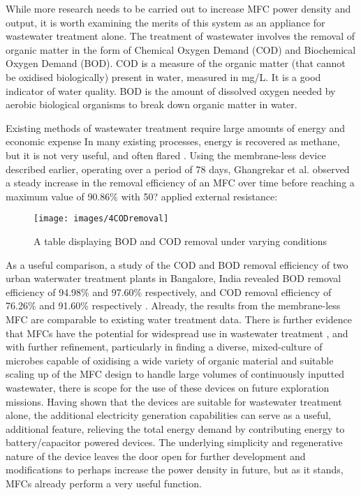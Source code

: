 \documentclass[12pt]{article}
\begin{document}
While more research needs to be carried out to increase MFC power density and output, it is worth examining the merits of this system as an appliance for wastewater treatment alone. The treatment of wastewater involves the removal of organic matter in the form of Chemical Oxygen Demand (COD) and Biochemical Oxygen Demand (BOD). COD is a measure of the organic matter (that cannot be oxidised biologically) present in water, measured in mg/L. It is a good indicator of water quality. BOD is the amount of dissolved oxygen needed by aerobic biological organisms to break down organic matter in water. \cite{surez2005determination} 

Existing methods of wastewater treatment require large amounts of energy and economic expense In many existing processes, energy is recovered as methane, but it is not very useful, and often flared \cite{ghangrekar2006wastewater,chang2005improvement}. Using the membrane-less device described earlier, operating over a period of 78 days, Ghangrekar et al. \cite{ghangrekar2006wastewater} observed a steady increase in the removal efficiency of an MFC over time before reaching a maximum value of 90.86\% with 50? applied external resistance:

\begin{figure}[ht]
\centering
\texttt{[image: images/4CODremoval]}
\caption{\cite{ghangrekar2006wastewater} A table displaying BOD and COD removal under varying conditions}
\label{fig:4CODremoval}
\end{figure}

As a useful comparison, a study of the COD and BOD removal efficiency of two urban waterwater treatment plants in Bangalore, India revealed BOD removal efficiency of 94.98\% and 97.60\% respectively, and COD removal efficiency of 76.26\% and 91.60\% respectively \cite{pravikumar2010assessment}. Already, the results from the membrane-less MFC are comparable to existing water treatment data. There is further evidence that MFCs have the potential for widespread use in wastewater treatment \cite{fornero2010electric}, and with further refinement, particularly in finding a diverse, mixed-culture of microbes capable of oxidising a wide variety of organic material and suitable scaling up of the MFC design to handle large volumes of continuously inputted wastewater, there is scope for the use of these devices on future exploration missions. Having shown that the devices are suitable for wastewater treatment alone, the additional electricity generation capabilities can serve as a useful, additional feature, relieving the total energy demand by contributing energy to battery/capacitor powered devices. The underlying simplicity and regenerative nature of the device leaves the door open for further development and modifications to perhaps increase the power density in future, but as it stands, MFCs already perform a very useful function.
\end{document}
